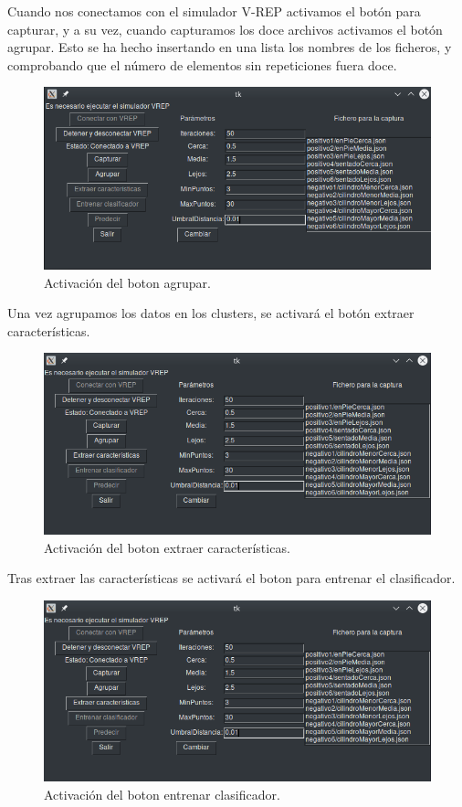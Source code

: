 \documentclass[12pt, spanish]{article}
\begin{document}
Cuando nos conectamos con el simulador V-REP activamos el botón para capturar, y a su vez, cuando capturamos los doce archivos activamos el botón agrupar. Esto se ha hecho insertando en una lista los nombres de los ficheros, y comprobando que el número de elementos sin repeticiones fuera doce.


\begin{figure}[H]
    \centering
    \includegraphics[width=\textwidth]{boton_agrupar_activo.png}
    \caption{Activación del boton agrupar.}
\end{figure}

Una vez agrupamos los datos en los clusters, se activará el botón extraer características.


\begin{figure}[H]
    \centering
    \includegraphics[width=\textwidth]{boton_extraer_c.png}
    \caption{Activación del boton extraer características.}
\end{figure}

Tras extraer las características se activará el boton para entrenar el clasificador.

\begin{figure}[H]
    \centering
    \includegraphics[width=\textwidth]{boton_extraer_c.png}
    \caption{Activación del boton entrenar clasificador.}
\end{figure}
\end{document}
